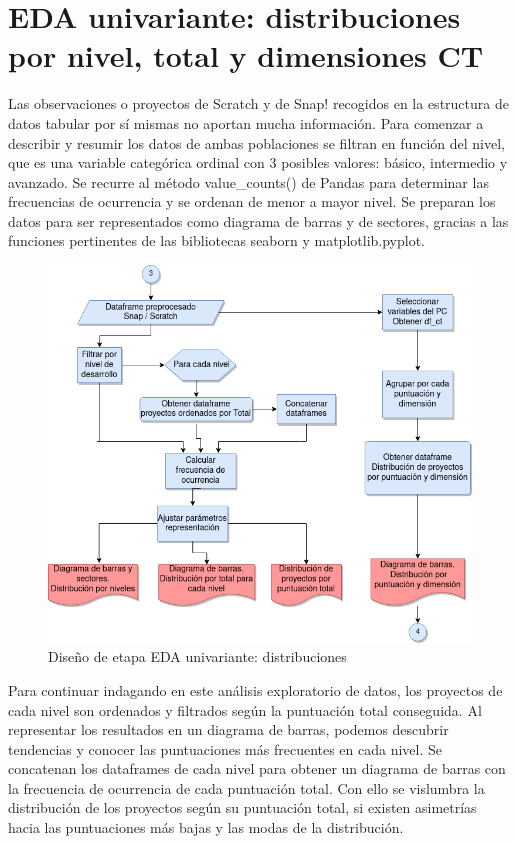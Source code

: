 \documentclass[a4paper, 12pt]{book}
\begin{document}
\section{EDA univariante: distribuciones por nivel, total y dimensiones CT} 
\label{sec:EDA_univariante}

Las observaciones o proyectos de Scratch y de Snap! recogidos en la estructura de datos tabular por sí mismas no aportan mucha información. Para comenzar a describir y resumir los datos de ambas poblaciones se filtran en función del nivel, que es una variable categórica ordinal con 3 posibles valores: básico, intermedio y avanzado. Se recurre al método value\_counts() de Pandas para determinar las frecuencias de ocurrencia y se ordenan de menor a mayor nivel. Se preparan los datos para ser representados como diagrama de barras y de sectores, gracias a las funciones pertinentes de las bibliotecas seaborn y matplotlib.pyplot.  

\begin{figure}[H]
    \centering
    \includegraphics[height=.5\textheight]{img/diseno_distribucion}
    \caption{Diseño de etapa EDA univariante: distribuciones}\label{fig:eda_uni}
\end{figure}

Para continuar indagando en este análisis exploratorio de datos, los proyectos de cada nivel son ordenados y filtrados según la puntuación total conseguida. Al representar los resultados en un diagrama de barras, podemos descubrir tendencias y conocer las puntuaciones más frecuentes en cada nivel.
Se concatenan los dataframes de cada nivel para obtener un diagrama de barras con la frecuencia de ocurrencia de cada puntuación total. Con ello se vislumbra la distribución de los proyectos según su puntuación total, si existen asimetrías hacia las puntuaciones más bajas y las modas de la distribución.
\end{document}

